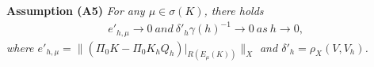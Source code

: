\documentclass[leqno,CJK]{siamltex704}
\numberwithin{equation}{section}
\begin{document}
	\textbf{Assumption (A5)}\emph{ For any $\mu\in\sigma(K)$, there holds
		\begin{eqnarray*}
			e'_{h,\mu}\rightarrow 0\ and \ \delta'_h\gamma(h)^{-1}\rightarrow 0 \ as \ h\rightarrow 0,
		\end{eqnarray*}
		where $e'_{h,\mu} = \|(\Pi_0 K-\Pi_0K_hQ_h)|_{R(E_\mu(K))}\|_X$ and $\delta'_h = \rho_X(V,V_h)$.}
	
	
\end{document}
